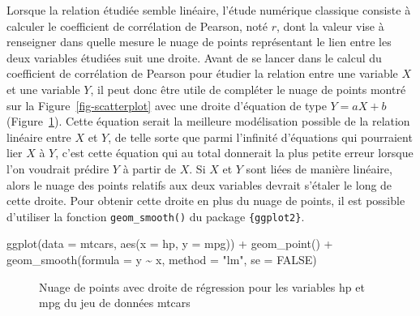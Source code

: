 \documentclass[
  letterpaper,
]{book}
\newenvironment{Shaded}{\begin{snugshade}}{\end{snugshade}}
\newcommand{\AttributeTok}[1]{\textcolor[rgb]{0.40,0.45,0.13}{#1}}
\newcommand{\ConstantTok}[1]{\textcolor[rgb]{0.56,0.35,0.01}{#1}}
\newcommand{\FunctionTok}[1]{\textcolor[rgb]{0.28,0.35,0.67}{#1}}
\newcommand{\NormalTok}[1]{\textcolor[rgb]{0.00,0.23,0.31}{#1}}
\newcommand{\SpecialCharTok}[1]{\textcolor[rgb]{0.37,0.37,0.37}{#1}}
\newcommand{\StringTok}[1]{\textcolor[rgb]{0.13,0.47,0.30}{#1}}
\begin{document}
Lorsque la relation étudiée semble linéaire, l'étude numérique classique
consiste à calculer le coefficient de corrélation de Pearson, noté
\(r\), dont la valeur vise à renseigner dans quelle mesure le nuage de
points représentant le lien entre les deux variables étudiées suit une
droite. Avant de se lancer dans le calcul du coefficient de corrélation
de Pearson pour étudier la relation entre une variable \(X\) et une
variable \(Y\), il peut donc être utile de compléter le nuage de points
montré sur la Figure~\ref{fig-scatterplot} avec une droite d'équation de
type \(Y = aX + b\) (Figure~\ref{fig-scatterplotLine}). Cette équation
serait la meilleure modélisation possible de la relation linéaire entre
\(X\) et \(Y\), de telle sorte que parmi l'infinité d'équations qui
pourraient lier \(X\) à \(Y\), c'est cette équation qui au total
donnerait la plus petite erreur lorsque l'on voudrait prédire \(Y\) à
partir de \(X\). Si \(X\) et \(Y\) sont liées de manière linéaire, alors
le nuage des points relatifs aux deux variables devrait s'étaler le long
de cette droite. Pour obtenir cette droite en plus du nuage de points,
il est possible d'utiliser la fonction \texttt{geom\_smooth()} du
package \texttt{\{ggplot2\}}.

\begin{Shaded}
\begin{Highlighting}[]
\FunctionTok{ggplot}\NormalTok{(}\AttributeTok{data =}\NormalTok{ mtcars, }\FunctionTok{aes}\NormalTok{(}\AttributeTok{x =}\NormalTok{ hp, }\AttributeTok{y =}\NormalTok{ mpg)) }\SpecialCharTok{+} 
  \FunctionTok{geom\_point}\NormalTok{() }\SpecialCharTok{+}
  \FunctionTok{geom\_smooth}\NormalTok{(}\AttributeTok{formula =}\NormalTok{ y }\SpecialCharTok{\textasciitilde{}}\NormalTok{ x, }\AttributeTok{method =} \StringTok{"lm"}\NormalTok{, }\AttributeTok{se =} \ConstantTok{FALSE}\NormalTok{)}
\end{Highlighting}
\end{Shaded}

\begin{figure}[H]


\caption{\label{fig-scatterplotLine}Nuage de points avec droite de
régression pour les variables hp et mpg du jeu de données mtcars}

\end{figure}%
\end{document}
